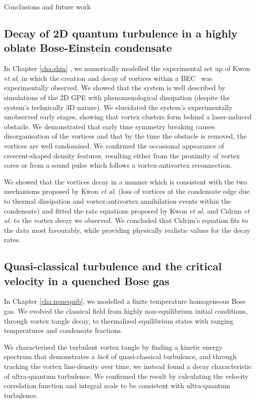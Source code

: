 \begin{chapter}{\label{cha:conc}Conclusions and future work}
\subsection{Decay of 2D quantum turbulence in a highly oblate Bose-Einstein condensate}
In Chapter \ref{cha:shin} , we numerically modelled the experimental set up of Kwon {\it et al.} in which the creation and decay of vortices within a BEC~\citep{kwon_moon_14} was experimentally observed. We showed that the system is well described by simulations of the 2D GPE with phenomenological dissipation (despite the system's technically 3D nature). We elucidated the system's experimentally unobserved early stages, showing that vortex clusters form behind a laser-induced obstacle. We demonstrated that early time symmetry breaking causes disorganisation of the vortices and that by the time the obstacle is removed, the vortices are well randomised. We confirmed the occasional appearance of crescent-shaped density features, resulting either from the proximity of vortex cores or from a sound pulse which follows a vortex-antivortex reconnection.

We showed that the vortices decay in a manner which is consistent with the two mechanisms proposed by Kwon {\it et al.} (loss of vortices at the condensate edge due to thermal dissipation and vortex-antivortex annihilation events within the condensate) and fitted the rate equations proposed by Kwon {\it et al.} and Cidrim {\it et al.} to the vortex decay we observed. We concluded that Cidrim's equation fits to the data most favourably, while providing physically realistic values for the decay rates.

\subsection{Quasi-classical turbulence and the critical velocity in a quenched Bose gas}
In Chapter \ref{cha:nonequib}, we modelled a finite temperature homogeneous Bose gas. We evolved the classical field from highly non-equilibrium initial conditions, through vortex tangle decay, to thermalized equilibrium states with ranging temperatures and condensate fractions.

We characterised the turbulent vortex tangle by finding a kinetic energy spectrum that demonstrates a {\it lack} of quasi-classical turbulence, and through tracking the vortex line-density over time, we instead found a decay characteristic of ultra-quantum turbulence. We confirmed the result by calculating the velocity correlation function and integral scale to be consistent with ultra-quantum turbulence.


\end{chapter}
